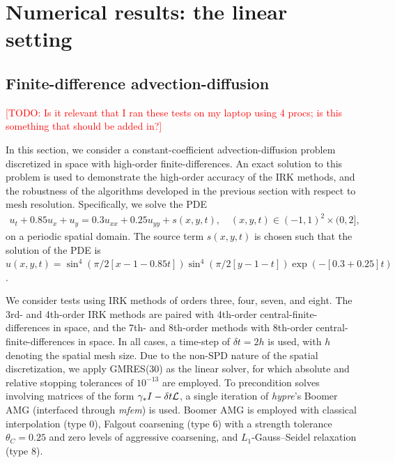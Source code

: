 \documentclass[review]{siamart}
\makeatletter
\newcommand{\todo}[1]{\textcolor{red}{[TODO\@: #1]}}
\makeatother
\begin{document}
\section{Numerical results: the linear setting}\label{sec:numerics_lin}


\subsection{Finite-difference advection-diffusion}\label{sec:numerics_lin:fd}

\todo{Is it relevant that I ran these tests on my laptop using 4 procs; is this something that should be added in?}

In this section, we consider a constant-coefficient advection-diffusion problem discretized in space with high-order finite-differences. An exact solution to this problem is used to demonstrate the high-order accuracy of the IRK methods, and the robustness of the algorithms developed in the previous section with respect to mesh resolution. Specifically, we solve the PDE
\begin{align} \label{eq:FD_ex}
u_t + 0.85 u_x + u_y = 0.3 u_{xx} + 0.25 u_{yy} + s(x,y,t),
\quad (x,y,t) \in (-1,1)^2 \times (0,2],
\end{align}
on a periodic spatial domain. The source term $s(x,y,t)$ is chosen such that the solution of the PDE is $u(x,y,t)=\sin^4(\pi/2[x-1-0.85t]) \sin^4(\pi/2 [y-1-t]) \exp(-[0.3+0.25]t)$. 

We consider tests using IRK methods of orders three, four, seven, and eight. The 3rd- and 4th-order IRK methods are paired with 4th-order central-finite-differences in space, and the 7th- and 8th-order methods with 8th-order central-finite-differences in space. In all cases, a time-step of $\delta t = 2 h$ is used, with $h$ denoting the spatial mesh size. Due to the non-SPD nature of the spatial discretization, we apply GMRES(30) as the linear solver, for which absolute and relative stopping tolerances of $10^{-13}$ are employed. To precondition solves involving matrices of the form $\gamma_* I - \delta t {\cal L}$, a single iteration of \textit{hypre}'s Boomer AMG (interfaced through \textit{mfem}) is used. Boomer AMG is employed with classical interpolation (type 0), Falgout coarsening (type 6) with a strength tolerance $\theta_C = 0.25$ and zero levels of aggressive coarsening, and $L_1$-Gauss--Seidel relaxation (type 8). 
\end{document}
